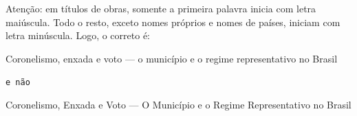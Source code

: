 \documentclass[a4paper,12pt,oneside,onecolumn,final,fleqn]{repUERJ}
\begin{document}
    Atenção: em títulos de obras, somente a primeira palavra inicia com letra maiúscula. Todo o resto, exceto nomes próprios e nomes de países, iniciam com letra minúscula. Logo, o correto é: 
    
        Coronelismo, enxada e voto — o município e o regime representativo no Brasil
        
        \texttt{e não}
        
        Coronelismo, Enxada e Voto — O Município e o Regime Representativo no Brasil


\appendix


\annex


\printindex
\end{document}

